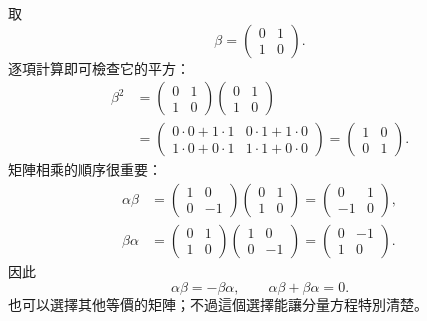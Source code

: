 取
\begin{equation}
\beta=
\begin{pmatrix}
0&1\\
1&0
\end{pmatrix}.
\end{equation}
逐項計算即可檢查它的平方：
\begin{equation}
\begin{aligned}
\beta^2
&=
\begin{pmatrix}
0&1\\
1&0
\end{pmatrix}
\begin{pmatrix}
0&1\\
1&0
\end{pmatrix}\\
&=
\begin{pmatrix}
0\cdot0+1\cdot1&0\cdot1+1\cdot0\\
1\cdot0+0\cdot1&1\cdot1+0\cdot0
\end{pmatrix}
=
\begin{pmatrix}
1&0\\
0&1
\end{pmatrix}.
\end{aligned}
\end{equation}
矩陣相乘的順序很重要：
\begin{align}
\alpha\beta
&=
\begin{pmatrix}
1&0\\
0&-1
\end{pmatrix}
\begin{pmatrix}
0&1\\
1&0
\end{pmatrix}
=
\begin{pmatrix}
0&1\\
-1&0
\end{pmatrix},\\
\beta\alpha
&=
\begin{pmatrix}
0&1\\
1&0
\end{pmatrix}
\begin{pmatrix}
1&0\\
0&-1
\end{pmatrix}
=
\begin{pmatrix}
0&-1\\
1&0
\end{pmatrix}.
\end{align}
因此
\begin{equation}
\alpha\beta=-\beta\alpha,
\qquad
\alpha\beta+\beta\alpha=0.
\end{equation}
也可以選擇其他等價的矩陣；不過這個選擇能讓分量方程特別清楚。

